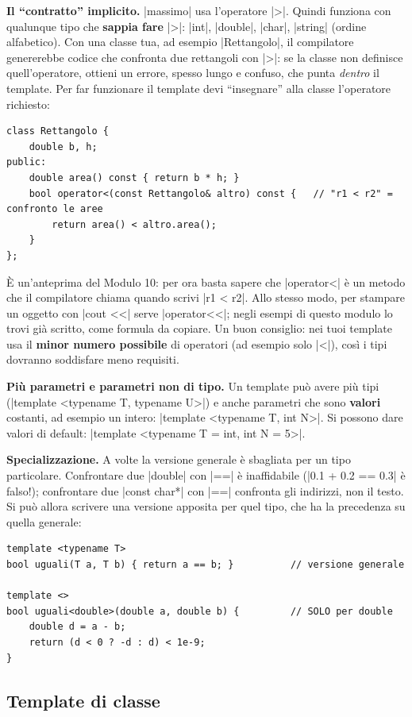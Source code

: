 \textbf{Il ``contratto'' implicito.} \cc|massimo| usa l'operatore \cc|>|. Quindi
funziona con qualunque tipo che \textbf{sappia fare} \cc|>|: \cc|int|, \cc|double|,
\cc|char|, \cc|string| (ordine alfabetico). Con una classe tua, ad esempio
\cc|Rettangolo|, il compilatore genererebbe codice che confronta due rettangoli
con \cc|>|: se la classe non definisce quell'operatore, ottieni un errore, spesso
lungo e confuso, che punta \emph{dentro} il template. Per far funzionare il
template devi ``insegnare'' alla classe l'operatore richiesto:
\begin{lstlisting}
class Rettangolo {
    double b, h;
public:
    double area() const { return b * h; }
    bool operator<(const Rettangolo& altro) const {   // "r1 < r2" = confronto le aree
        return area() < altro.area();
    }
};
\end{lstlisting}
È un'anteprima del Modulo 10: per ora basta sapere che \cc|operator<| è un metodo
che il compilatore chiama quando scrivi \cc|r1 < r2|. Allo stesso modo, per
stampare un oggetto con \cc|cout <<| serve \cc|operator<<|; negli esempi di questo
modulo lo trovi già scritto, come formula da copiare. Un buon consiglio: nei tuoi
template usa il \textbf{minor numero possibile} di operatori (ad esempio solo
\cc|<|), così i tipi dovranno soddisfare meno requisiti.

\textbf{Più parametri e parametri non di tipo.} Un template può avere più tipi
(\cc|template <typename T, typename U>|) e anche parametri che sono
\textbf{valori} costanti, ad esempio un intero:
\cc|template <typename T, int N>|. Si possono dare valori di default:
\cc|template <typename T = int, int N = 5>|.

\textbf{Specializzazione.} A volte la versione generale è sbagliata per un tipo
particolare. Confrontare due \cc|double| con \cc|==| è inaffidabile
(\cc|0.1 + 0.2 == 0.3| è falso!); confrontare due \cc|const char*| con \cc|==|
confronta gli indirizzi, non il testo. Si può allora scrivere una versione
apposita per quel tipo, che ha la precedenza su quella generale:
\begin{lstlisting}
template <typename T>
bool uguali(T a, T b) { return a == b; }          // versione generale

template <>
bool uguali<double>(double a, double b) {         // SOLO per double
    double d = a - b;
    return (d < 0 ? -d : d) < 1e-9;
}
\end{lstlisting}

\subsection*{Template di classe}

